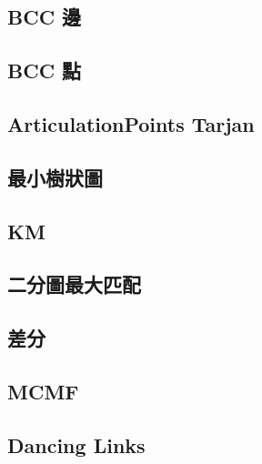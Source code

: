     \subsection{BCC 邊}
    \subsection{BCC 點}
    \subsection{ArticulationPoints Tarjan}
    \subsection{最小樹狀圖}
    \subsection{KM}
        
    \subsection{二分圖最大匹配}
        
    \subsection{差分}
    \subsection{MCMF}
    \subsection{Dancing Links}
        
